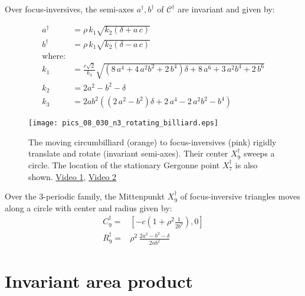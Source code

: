 \begin{proposition}
Over focus-inversives, the semi-axes $a^\dagger,b^\dagger$ of $\mathcal{C}^\dagger$ are invariant and given by:

\begin{align*}
    a^\dagger&= \rho\,k_1
\sqrt {k_2\left(\delta+a\,c\right)}\\
    b^\dagger&= \rho\,k_1
\sqrt {k_2\left(\delta-a\,c\right) }\\
 \mbox{where:}&\\
k_1&=\frac{c \sqrt{2}}{k_3}\sqrt { \left( 8\,{a}^{4}+4\,{a}^{2}{b}^{2}+2\,{b}^{4}
 \right) \delta+8\,{a}^{6}+3\,{a}^{2}{b}^{4}+2\,{b}^{6}}\\
 k_2&=2 a^2-b^2-\delta\\
k_3&=2a  {b}^{2} \left(  \left( 2\,{a}^{2}-{b}^{2} \right) \delta+2
\,{a}^{4}-2\,{a}^{2}{b}^{2}-{b}^{4}\right)
\end{align*}
\end{proposition}

\begin{figure}
    \centering
    \texttt{[image: pics\_08\_030\_n3\_rotating\_billiard.eps]}
    \caption{The moving circumbilliard (orange) to focus-inversives (pink) rigidly translate and rotate (invariant semi-axes). Their center $X_9^\dagger$ sweeps a circle. The location of the stationary Gergonne point $X_7^\dagger$ is also shown. \href{https://youtu.be/LOJK5izTctI}{Video 1}, \href{https://youtu.be/Y-j5eXqKGQE}{Video 2}}
    \label{fig:08-n3-moving-billiard-table}
\end{figure}

\begin{proposition}
Over the 3-periodic family, the Mittenpunkt $X_9^\dagger$ of focus-inversive triangles moves along a circle with center and radius given by:
\begin{align*}
    C_9^\dagger=&\left[-c\left(1+\rho^2 \frac{1}{2b^2}\right), 0\right] \\
    R_9^\dagger=&\rho^2\, \frac{2a^2-b^2-\delta}{2 a b^2}
\end{align*}
\label{prop:08-x9}
\end{proposition}

\section{Invariant area product}

